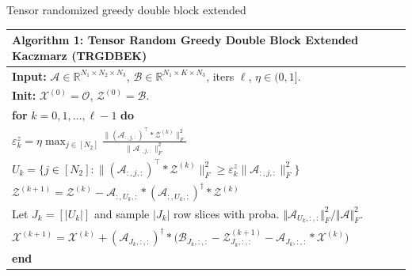 \documentclass[aspectratio=169]{beamer}
\def\fm#1{\mathcal{#1}}
\def\m#1{\boldsymbol{#1}}
\def \ai#1{\m A_{I_{#1}, :}}
\def\fm#1{\mathcal{#1}}
\def\m#1{\boldsymbol{#1}}
\def \ai#1{\fm A_{#1, :, :}}
\begin{document}
\begin{frame}[t]{Tensor  randomized greedy double block extended}
\scriptsize
\setlength{\tabcolsep}{2pt}
\renewcommand{\arraystretch}{1.05}

\begin{center}
\begin{tabular*}{\linewidth}{@{\extracolsep{\fill}}l@{}}
\toprule
{\bf Algorithm 1:} Tensor Random Greedy Double Block Extended Kaczmarz (TRGDBEK)\\
\midrule
{\bf Input:} $\mathcal{A}\!\in\!\mathbb{R}^{N_1\times N_2\times N_3}$, $\mathcal{B}\!\in\!\mathbb{R}^{N_1\times K\times N_3}$, iters $\ell$, $\eta\in(0,1]$.\\
{\bf Init:} $\mathcal{X}^{(0)}=\mathcal{O}$, $\mathcal{Z}^{(0)}=\mathcal{B}$.\\
{\bf for} $k=0,1,\ldots,\ell-1$ {\bf do}\\
\quad $\displaystyle \varepsilon_k^{z}=\eta\max_{j\in[N_2]}
\frac{\|(\mathcal{A}_{:,j,:})^\top * \mathcal{Z}^{(k)}\|_{F}^2}{\|\mathcal{A}_{:,j,:}\|_{F}^2}$\\[-0.2em]
\quad $\displaystyle U_k=\Big\{j\in[N_2]:\|(\mathcal{A}_{:,j,:})^\top * \mathcal{Z}^{(k)}\|_{F}^2\ge
\varepsilon_k^{z}\|\mathcal{A}_{:,j,:}\|_{F}^2\Big\}$\\[-0.2em]
\quad $\displaystyle \mathcal{Z}^{(k+1)}=\mathcal{Z}^{(k)}-\mathcal{A}_{:,U_k,:}*(\mathcal{A}_{:,U_k,:})^\dagger*\mathcal{Z}^{(k)}$\\[-0.1em]
\quad Let $J_k = [\vert U_k \vert]$ and sample $\vert J_k\vert$ row slices with proba. $\Vert \ai{U_k}\Vert_F^2/\Vert \fm A \Vert_F^2$.\\
\quad $\displaystyle \mathcal{X}^{(k+1)}=\mathcal{X}^{(k)}+(\mathcal{A}_{J_k,:,:})^\dagger*
\Big(\mathcal{B}_{J_k,:,:}-\mathcal{Z}^{(k+1)}_{J_k,:,:}-\mathcal{A}_{J_k,:,:}*\mathcal{X}^{(k)}\Big)$\\
{\bf end}\\
\bottomrule
\end{tabular*}
\end{center}
\end{frame}
\end{document}
